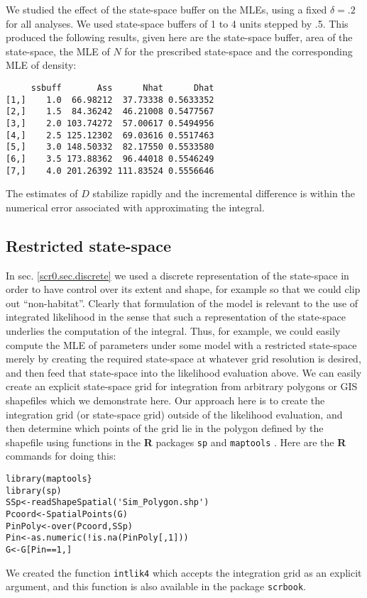 We studied the effect of the state-space buffer on the MLEs,
using a fixed $\delta = .2$ for all analyses. We used state-space buffers
of 1 to 4 units stepped by .5. This produced the following results,
given here are the state-space buffer, area of the state-space, the
MLE of $N$ for the prescribed state-space and the corresponding MLE of
density:
{\small
\begin{verbatim}
     ssbuff       Ass      Nhat      Dhat
[1,]    1.0  66.98212  37.73338 0.5633352
[2,]    1.5  84.36242  46.21008 0.5477567
[3,]    2.0 103.74272  57.00617 0.5494956
[4,]    2.5 125.12302  69.03616 0.5517463
[5,]    3.0 148.50332  82.17550 0.5533580
[6,]    3.5 173.88362  96.44018 0.5546249
[7,]    4.0 201.26392 111.83524 0.5556646
\end{verbatim}
}
The estimates of $D$ stabilize rapidly and the incremental difference
is within the numerical error associated with approximating the
integral.  

\subsection{Restricted state-space}
\label{mle.sec.shapefile}

In sec. \ref{scr0.sec.discrete} 
 we used a discrete representation of
the state-space in order to have control over its extent and shape,
for example so that we could clip out ``non-habitat''. Clearly that
formulation of the model is relevant to the use of integrated
likelihood in the sense that such a representation of the state-space
underlies the computation of the integral. Thus, for example, we could
easily compute the MLE of parameters under some model with a
restricted state-space merely by creating the required state-space at
whatever grid resolution is desired, and then feed that state-space
into the likelihood evaluation above. We can easily create an explicit
state-space grid for integration from arbitrary polygons or GIS
shapefiles  which we 
demonstrate here. Our approach here is to create the integration grid
(or state-space grid) outside of the likelihood evaluation, and then
determine which points of the grid lie in the polygon defined by the
shapefile using 
functions in the {\bf R} packages \mbox{\tt sp}  and
\mbox{\tt maptools}  .  Here
are the {\bf R} commands for doing this:  
{\small
\begin{verbatim}
library(maptools}
library(sp)
SSp<-readShapeSpatial('Sim_Polygon.shp')
Pcoord<-SpatialPoints(G)
PinPoly<-over(Pcoord,SSp)
Pin<-as.numeric(!is.na(PinPoly[,1]))
G<-G[Pin==1,]
\end{verbatim}
}
We created  the function \mbox{\tt intlik4} which accepts the integration
grid as an explicit argument, and this function is also available in
the package  \mbox{\tt scrbook}.

